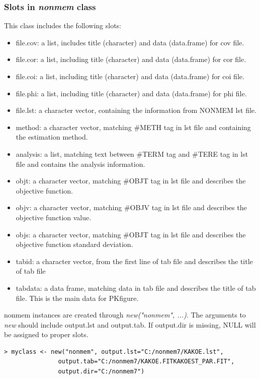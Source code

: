 \documentclass[a4paper]{article}
\begin{document}
\subsubsection{Slots in \textit{nonmem} class}
This class includes the following slots:
\begin{itemize}
	\item file.cov: a list, includes title (character) and data (data.frame) for cov file.
	\item file.cor: a list, including title (character) and data (data.frame) for cor file.
	\item file.coi: a list, including title (character) and data (data.frame) for coi file.
	\item file.phi: a list, including title (character) and data (data.frame) for phi file.
\item file.lst: a character vector, containing the information from NONMEM lst file.
\item method: a character vector, matching \#METH tag in lst file and containing the estimation method.
\item analysis: a list, matching text between \#TERM tag and \#TERE tag in lst file and contains the analysis information.
	\item objt: a character vector, matching \#OBJT tag in lst file and describes the objective function.
	\item objv: a character vector, matching \#OBJV tag in lst file and describes the objective function value.
	\item objs: a character vector, matching \#OBJT tag in lst file and describes the objective function standard deviation.
\item tabid: a character vector, from the first line of tab file and describes the title of tab file
\item tabdata: a data frame, matching data in tab file and describes the title of tab file. This is the main data for PKfigure.
\end{itemize}
nonmem instances are created through \textit{new("nonmem", ...)}.
The arguments to \textit{new} should include output.lst and output.tab.
If output.dir is missing, NULL will be assigned to proper slots.
\begin{verbatim}
> myclass <- new("nonmem", output.lst="C:/nonmem7/KAKOE.lst",
               output.tab="C:/nonmem7/KAKOE.FITKAKOEST_PAR.FIT",
               output.dir="C:/nonmem7")

\end{verbatim}
\end{document}
